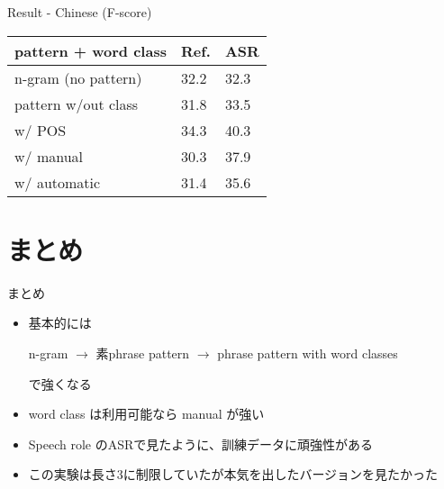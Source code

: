 \documentclass[12pt, dvipdfmx, default, cjk]{beamer}
\begin{document}
\begin{frame}{Result - Chinese (F-score)}
  \begin{table}[h]
    \begin{tabular}{l|l|l} \hline
       pattern + word class & Ref.   & ASR \\ \hline
       n-gram (no pattern)  & 32.2 & 32.3 \\
       pattern w/out class  & 31.8 & 33.5 \\
       w/ POS        & \alert{34.3} & \alert{40.3} \\
       w/ manual     & 30.3 & 37.9 \\
       w/ automatic  & 31.4 & 35.6 \\ \hline
     \end{tabular}
   \end{table}
\end{frame}

\section{まとめ}
\begin{frame}{まとめ}
  \begin{itemize}
    \item
      基本的には

      n-gram
      $\rightarrow$
      素phrase pattern
      $\rightarrow$
      phrase pattern with word classes

      で強くなる

    \item word class は利用可能なら manual が強い
    \item Speech role のASRで見たように、訓練データに頑強性がある
      \pause
    \item この実験は長さ3に制限していたが本気を出したバージョンを見たかった

  \end{itemize}
\end{frame}
\end{document}
